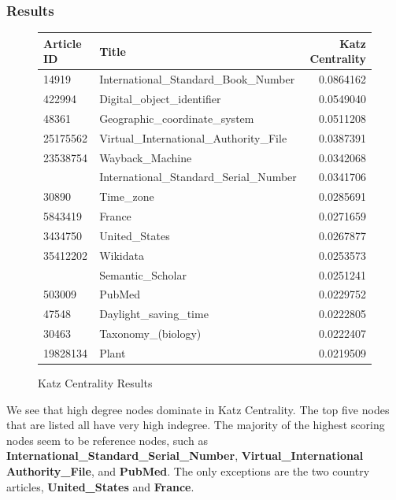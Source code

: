 \documentclass{article}
\begin{document}
\subsubsection{Results}
\begin{figure}[H]
    \centering
    \caption{Katz Centrality Results}
    \begin{tabular}{llr}
        \toprule
        Article ID & Title & Katz Centrality\\
        \midrule
        14919 & International\_Standard\_Book\_Number & 0.0864162\\
        422994 & Digital\_object\_identifier & 0.0549040\\
        48361 & Geographic\_coordinate\_system & 0.0511208\\
        25175562 & Virtual\_International\_Authority\_File & 0.0387391\\
    23538754 & Wayback\_Machine & 0.0342068\\
    \addlinespace
    234930 & International\_Standard\_Serial\_Number & 0.0341706\\
    30890 & Time\_zone & 0.0285691\\
    5843419 & France & 0.0271659\\
    3434750 & United\_States & 0.0267877\\
    35412202 & Wikidata & 0.0253573\\
    \addlinespace
    48455863 & Semantic\_Scholar & 0.0251241\\
    503009 & PubMed & 0.0229752\\
    47548 & Daylight\_saving\_time & 0.0222805\\
    30463 & Taxonomy\_(biology) & 0.0222407\\
    19828134 & Plant & 0.0219509\\
    \bottomrule
    \end{tabular}
\end{figure}

We see that high degree nodes dominate in Katz Centrality.
The top five nodes that are listed all have very high indegree.
The majority of the highest scoring nodes seem to be reference nodes, such as \textbf{International\_Standard\_Serial\_Number}, \textbf{Virtual\_International Authority\_File}, and \textbf{PubMed}.
The only exceptions are the two country articles, \textbf{United\_States} and \textbf{France}.

\end{document}
